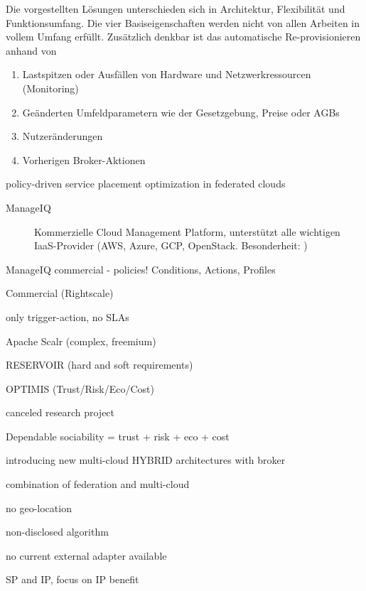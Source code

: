 Die vorgestellten Lösungen unterschieden sich in Architektur, Flexibilität und Funktionsumfang. Die vier Basiseigenschaften werden nicht von allen Arbeiten in vollem Umfang erfüllt. Zusätzlich denkbar ist das automatische Re-provisionieren anhand von 

\begin{enumerate}
	\item Lastspitzen oder Ausfällen von Hardware und Netzwerkressourcen (Monitoring)
	\item Geänderten Umfeldparametern wie der Gesetzgebung, Preise oder AGBs
	\item Nutzeränderungen
	\item Vorherigen Broker-Aktionen
\end{enumerate}

policy-driven service placement optimization in federated clouds 



\begin{description}
	\item[ManageIQ] Kommerzielle Cloud Management Platform, unterstützt alle wichtigen IaaS-Provider (AWS, Azure, GCP, OpenStack. Besonderheit: )
\end{description}

ManageIQ commercial
- policies! Conditions, Actions, Profiles


Commercial (Rightscale) 

only trigger-action, no SLAs 

Apache Scalr (complex, freemium) 





RESERVOIR (hard and soft requirements) 



OPTIMIS (Trust/Risk/Eco/Cost) 

canceled research project 

Dependable sociability = trust + risk + eco + cost 

introducing new multi-cloud HYBRID architectures with broker 

combination of federation and multi-cloud 

no geo-location 

non-disclosed algorithm 

no current external adapter available 

SP and IP, focus on IP benefit 





